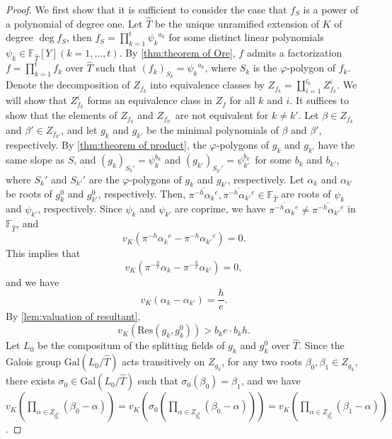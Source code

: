 \documentclass[10pt,a4paper]{amsart}
\newcommand{\field}[1]{\mathbb{#1}}
\newcommand{\Gal}{\mathrm{Gal}}
\numberwithin{equation}{section}
\begin{document}
  \begin{proof}
    We first show that it is sufficient to consider the case that $f_S$ is a power of a polynomial of degree one. 
    Let $\hat{T}$ be the unique unramified extension of $K$ of degree $\deg f_S$, then 
    $f_S = \prod_{k = 1}^t {\psi_k}^{a_k}$ for some distinct linear polynomials $\psi_k \in \field{F}_{\hat{T}}[Y] (k = 1, \dots ,t)$. 
    By \cref{thm:theorem of Ore}, $f$ admits a factorization $f = \prod_{k = 1}^t f_k$ over $\hat{T}$ such that $(f_k)_{S_{k}} = {\psi_k}^{a_k}$, where $S_{k}$ is the $\varphi$-polygon of $f_k$. 
    Denote the decomposition of $Z_{f_k}$ into equivalence classes by $Z_{f_k} = \coprod_{i = 1}^{l_k} Z_{f_k}^i$. 
    We will show that $Z_{f_k}^i$ forms an equivalence class in $Z_f$ for all $k$ and $i$. 
    It suffices to show that the elements of $Z_{f_k}$ and $Z_{f_{k'}}$ are not equivalent for $k \ne k'$. 
    Let $\beta \in Z_{f_k}$ and $\beta' \in Z_{f_{k'}}$, and  
    let $g_k$ and $g_{k'}$ be the minimal polynomials of $\beta$ and $\beta'$, respectively. 
    By \cref{thm:theorem of product}, the $\varphi$-polygons of $g_k$ and $g_{k'}$ have the same slope as $S$, 
    and $(g_k)_{S_{k}'} = \psi_k^{b_k}$ and $(g_{k'})_{S_{k'}'} = \psi_{k'}^{b_{k'}}$ for some $b_k$ and $b_{k'}$, where $S_{k}'$ and $S_{k'}'$ are the $\varphi$-polygons of $g_k$ and $g_{k'}$, respectively. 
    Let $\alpha_k$ and $\alpha_{k'}$ be roots of $g_k^0$ and $g_{k'}^0$, respectively. 
    Then, $\overline{\pi^{-h}{\alpha_k}^e}, \overline{\pi^{-h}{\alpha_{k'}}^e} \in \field{F}_{\hat{T}}$ are roots of $\psi_k$ and $\psi_{k'}$, respectively. 
    Since $\psi_k$ and $\psi_{k'}$ are coprime, we have $\overline{\pi^{-h}{\alpha_k}^e} \ne \overline{\pi^{-h}{\alpha_{k'}}^e}$ in $\field{F}_{\hat{T}}$, and 
    \[
      v_K(\pi^{-h}{\alpha_k}^e - \pi^{-h}{\alpha_{k'}}^e) = 0. 
    \]
    This implies that 
    \[
      v_K(\pi^{-\frac{h}{e}}\alpha_k - \pi^{-\frac{h}{e}}\alpha_{k'}) = 0, 
    \]
    and we have 
    \[
      v_K(\alpha_k - \alpha_{k'}) = \frac{h}{e}. 
    \]
    By \cref{lem:valuation of resultant}, 
    \[
      v_K(\mathrm{Res}(g_k,g_k^0)) > b_k e \cdot b_k h. 
    \]
    Let $L_0$ be the compositum of the splitting fields of $g_k$ and $g_k^0$ over $\hat{T}$. 
    Since the Galois group $\Gal(L_0/\hat{T})$ acts transitively on $Z_{g_k}$,
    for any two roots $\beta_0, \beta_1 \in Z_{g_k}$, there exists $\sigma_0 \in \Gal(L_0/\hat{T})$ such that 
    $\sigma_0(\beta_0) = \beta_1$, and we have $v_K(\prod_{\alpha \in Z_{g_k^0}} (\beta_0 - \alpha)) = v_K(\sigma_0(\prod_{\alpha \in Z_{g_k^0}} (\beta_0 - \alpha))) = v_K(\prod_{\alpha \in Z_{g_k^0}} (\beta_1 - \alpha))$. 

\end{proof}
\end{document}

